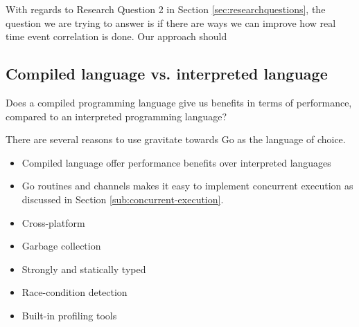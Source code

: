 With regards to Research Question 2 in Section \cref{sec:researchquestions}, the question we are trying to answer is if there are ways we can improve how real time event correlation is done. Our approach should 

\subsection{Compiled language vs. interpreted language}
\label{sub:use-compiled-language}

Does a compiled programming language give us benefits in terms of performance, compared to an interpreted programming language?


There are several reasons to use gravitate towards Go as the language of choice.
\begin{itemize}
    \item Compiled language offer performance benefits over interpreted languages
    \item Go routines and channels makes it easy to implement concurrent execution as discussed in Section \cref{sub:concurrent-execution}.
    \item Cross-platform
    \item Garbage collection
    \item Strongly and statically typed
    \item Race-condition detection
    \item Built-in profiling tools
\end{itemize}

